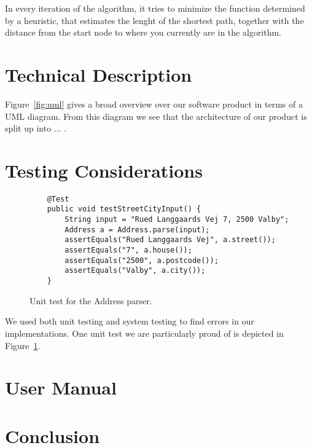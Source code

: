 \documentclass[11pt]{article}
\begin{document}
In every iteration of the algorithm, it tries to minimize the function determined by a heuristic, that estimates the lenght of the shortest path, together with the distance from the start node to where you currently are in the algorithm.

\section{Technical Description}\label{sec:technical}


Figure~\ref{fig:uml} gives a broad overview over our software product in terms of a UML diagram. From this diagram we see that the architecture of our product is split up into ... .

\section{Testing Considerations}\label{sec:testing}

\begin{figure}[t!]
    \begin{lstlisting}
    @Test
    public void testStreetCityInput() {
        String input = "Rued Langgaards Vej 7, 2500 Valby";
        Address a = Address.parse(input);
        assertEquals("Rued Langgaards Vej", a.street());
        assertEquals("7", a.house());
        assertEquals("2500", a.postcode());
        assertEquals("Valby", a.city());
    }
    \end{lstlisting}
    \caption{Unit test for the Address parser.}
    \label{fig:unittest}
\end{figure}

We used both unit testing and system testing to find errors in our implementations. One unit test we are particularly proud of is depicted in Figure~\ref{fig:unittest}.

\section{User Manual}\label{sec:manual}

\section{Conclusion}\label{sec:conclusion}
\end{document}

